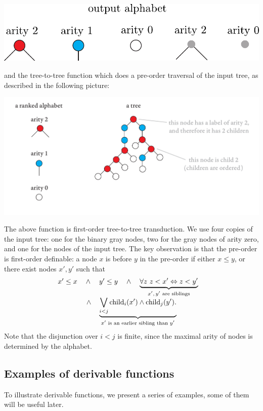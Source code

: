 \begin{example}
\begin{center}
    \includegraphics[scale=.4]{output-alphabet}
\end{center}    
    and the tree-to-tree function which does a pre-order traversal of the input tree, as described in the following picture:
\begin{center}
 \includegraphics[scale=.34, page=30]{pics}
\end{center}
     The above function is first-order tree-to-tree transduction. We use four copies of the input tree: one for the binary gray nodes, two for the gray nodes of arity zero, and one for the nodes of the input tree. The key observation is that the pre-order  is first-order definable: a node $x$ is before $y$ in the pre-order if either $x \le y$, or there exist nodes $x',y'$ such that 
     $$\begin{array}{c}
      x' \le x \quad \land \quad  y' \le y \quad \land \quad  \underbrace{\forall z \ z < x' \Leftrightarrow z < y'}_{\text{$x',y'$ are siblings}} \quad \\ \land \quad \underbrace{\bigvee_{i<j}\mathrm{child}_{i} (x') \land \mathrm{child}_{j}(y').}_{\text{$x'$ is an earlier sibling than $y'$}}
     \end{array}$$
     Note that the disjunction over  $i<j$ is finite, since the maximal arity of nodes is determined by the alphabet. 
\end{example}

\subsection{Examples of derivable functions}\label{sec:AppendixExamples}
To illustrate derivable functions, we present a series of examples, some of them will be useful later.


